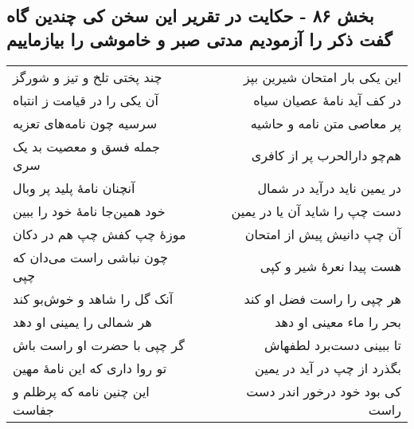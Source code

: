 \begin{center}
\section*{بخش ۸۶ - حکایت در تقریر این سخن کی چندین گاه گفت ذکر را آزمودیم مدتی صبر و خاموشی را بیازماییم}
\label{sec:sh086}
\begin{longtable}{l p{0.5cm} r}
چند پختی تلخ و تیز و شورگز
&&
این یکی بار امتحان شیرین بپز
\\
آن یکی را در قیامت ز انتباه
&&
در کف آید نامهٔ عصیان سیاه
\\
سرسیه چون نامه‌های تعزیه
&&
پر معاصی متن نامه و حاشیه
\\
جمله فسق و معصیت بد یک سری
&&
هم‌چو دارالحرب پر از کافری
\\
آنچنان نامهٔ پلید پر وبال
&&
در یمین ناید درآید در شمال
\\
خود همین‌جا نامهٔ خود را ببین
&&
دست چپ را شاید آن یا در یمین
\\
موزهٔ چپ کفش چپ هم در دکان
&&
آن چپ دانیش پیش از امتحان
\\
چون نباشی راست می‌دان که چپی
&&
هست پیدا نعرهٔ شیر و کپی
\\
آنک گل را شاهد و خوش‌بو کند
&&
هر چپی را راست فضل او کند
\\
هر شمالی را یمینی او دهد
&&
بحر را ماء معینی او دهد
\\
گر چپی با حضرت او راست باش
&&
تا ببینی دست‌برد لطفهاش
\\
تو روا داری که این نامهٔ مهین
&&
بگذرد از چپ در آید در یمین
\\
این چنین نامه که پرظلم و جفاست
&&
کی بود خود درخور اندر دست راست
\\
\end{longtable}
\end{center}
